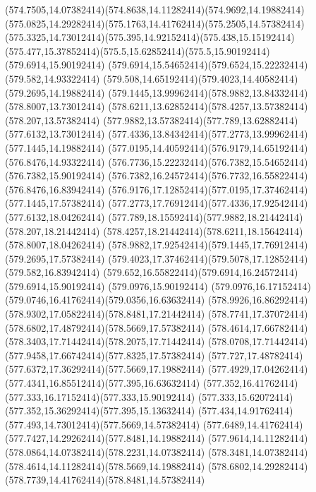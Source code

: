 {{	\curveto(574.7505,14.07382414)(574.8638,14.11282414)(574.9692,14.19882414)
	\curveto(575.0825,14.29282414)(575.1763,14.41762414)(575.2505,14.57382414)
	\curveto(575.3325,14.73012414)(575.395,14.92152414)(575.438,15.15192414)
	\curveto(575.477,15.37852414)(575.5,15.62852414)(575.5,15.90192414)
	\closepath
	\moveto(579.6914,15.90192414)
	\curveto(579.6914,15.54652414)(579.6524,15.22232414)(579.582,14.93322414)
	\curveto(579.508,14.65192414)(579.4023,14.40582414)(579.2695,14.19882414)
	\curveto(579.1445,13.99962414)(578.9882,13.84332414)(578.8007,13.73012414)
	\curveto(578.6211,13.62852414)(578.4257,13.57382414)(578.207,13.57382414)
	\curveto(577.9882,13.57382414)(577.789,13.62882414)(577.6132,13.73012414)
	\curveto(577.4336,13.84342414)(577.2773,13.99962414)(577.1445,14.19882414)
	\curveto(577.0195,14.40592414)(576.9179,14.65192414)(576.8476,14.93322414)
	\curveto(576.7736,15.22232414)(576.7382,15.54652414)(576.7382,15.90192414)
	\curveto(576.7382,16.24572414)(576.7732,16.55822414)(576.8476,16.83942414)
	\curveto(576.9176,17.12852414)(577.0195,17.37462414)(577.1445,17.57382414)
	\curveto(577.2773,17.76912414)(577.4336,17.92542414)(577.6132,18.04262414)
	\curveto(577.789,18.15592414)(577.9882,18.21442414)(578.207,18.21442414)
	\curveto(578.4257,18.21442414)(578.6211,18.15642414)(578.8007,18.04262414)
	\curveto(578.9882,17.92542414)(579.1445,17.76912414)(579.2695,17.57382414)
	\curveto(579.4023,17.37462414)(579.5078,17.12852414)(579.582,16.83942414)
	\curveto(579.652,16.55822414)(579.6914,16.24572414)(579.6914,15.90192414)
	\closepath
	\moveto(579.0976,15.90192414)
	\curveto(579.0976,16.17152414)(579.0746,16.41762414)(579.0356,16.63632414)
	\curveto(578.9926,16.86292414)(578.9302,17.05822414)(578.8481,17.21442414)
	\curveto(578.7741,17.37072414)(578.6802,17.48792414)(578.5669,17.57382414)
	\curveto(578.4614,17.66782414)(578.3403,17.71442414)(578.2075,17.71442414)
	\curveto(578.0708,17.71442414)(577.9458,17.66742414)(577.8325,17.57382414)
	\curveto(577.727,17.48782414)(577.6372,17.36292414)(577.5669,17.19882414)
	\curveto(577.4929,17.04262414)(577.4341,16.85512414)(577.395,16.63632414)
	\curveto(577.352,16.41762414)(577.333,16.17152414)(577.333,15.90192414)
	\curveto(577.333,15.62072414)(577.352,15.36292414)(577.395,15.13632414)
	\curveto(577.434,14.91762414)(577.493,14.73012414)(577.5669,14.57382414)
	\curveto(577.6489,14.41762414)(577.7427,14.29262414)(577.8481,14.19882414)
	\curveto(577.9614,14.11282414)(578.0864,14.07382414)(578.2231,14.07382414)
	\curveto(578.3481,14.07382414)(578.4614,14.11282414)(578.5669,14.19882414)
	\curveto(578.6802,14.29282414)(578.7739,14.41762414)(578.8481,14.57382414)
}}
